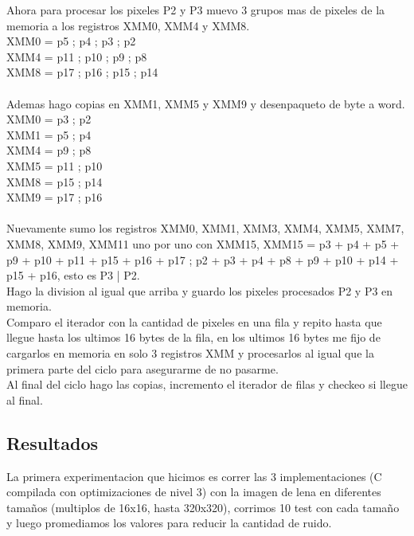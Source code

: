 Ahora para procesar los pixeles P2 y P3 muevo 3 grupos mas de pixeles de la memoria a los registros XMM0, XMM4 y XMM8. \\
	XMM0 = p5 ; p4 ; p3 ; p2 \\
	XMM4 = p11 ; p10 ; p9 ; p8 \\
	XMM8 = p17 ; p16 ; p15 ; p14 \\
\\
Ademas hago copias en XMM1, XMM5 y XMM9 y desenpaqueto de byte a word. \\
	XMM0 = p3 ; p2 \\
 	XMM1 = p5 ; p4 \\
	XMM4 = p9 ; p8 \\
	XMM5 = p11 ; p10 \\
 	XMM8 = p15 ; p14 \\
	XMM9 = p17 ; p16 \\
\\
Nuevamente sumo los registros XMM0, XMM1, XMM3, XMM4, XMM5, XMM7, XMM8, XMM9, XMM11 uno por uno con XMM15, XMM15 = p3 + p4 + p5 + p9 + p10 + p11 + p15 + p16 + p17 ; p2 + p3 + p4 + p8 + p9 + p10 + p14 + p15 + p16, esto es P3 | P2. \\

Hago la division al igual que arriba y guardo los pixeles procesados P2 y P3 en memoria. \\

Comparo el iterador con la cantidad de pixeles en una fila y repito hasta que llegue hasta los ultimos 16 bytes de la fila, en los ultimos 16 bytes me fijo de cargarlos en memoria en solo 3 registros XMM y procesarlos al igual que la primera parte del ciclo para asegurarme de no pasarme. \\

Al final del ciclo hago las copias, incremento el iterador de filas y checkeo si llegue al final. \\

\subsection{Resultados}
La primera experimentacion que hicimos es correr las 3 implementaciones (C compilada con optimizaciones de nivel 3) con la imagen de lena en diferentes tamaños (multiplos de 16x16, hasta 320x320), corrimos 10 test con cada tamaño y luego promediamos los valores para reducir la cantidad de ruido. \\

